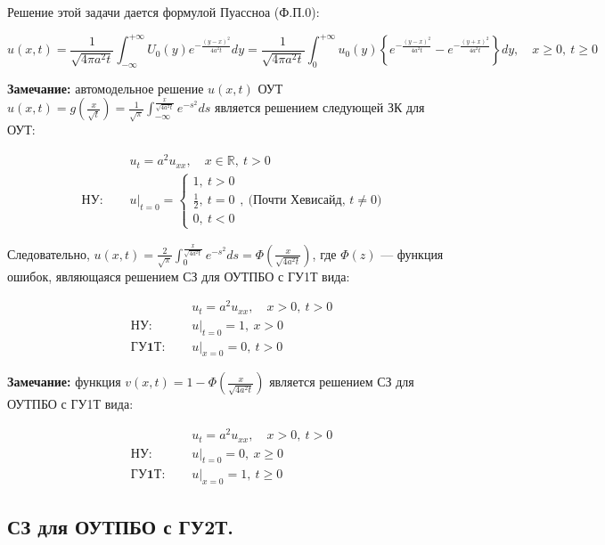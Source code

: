 Решение этой задачи дается формулой Пуассноа (Ф.П.0):

\[
	u(x, t) = \frac{1}{\sqrt{4\pi a^2t}} \int_{-\infty}^{+\infty} U_0(y) e^{-\frac{(y-x)^2}{4a^{2}t}} dy = 
	\frac{1}{\sqrt{4\pi a^2t}} \int_{0}^{+\infty} u_0(y) \left\{ e^{-\frac{(y-x)^2}{4a^{2}t}} - e^{-\frac{(y+x)^2}{4a^{2}t}} \right\} dy,\quad
	x \ge 0,\ t \ge 0
\]

\textbf{Замечание:} автомодельное решение $u(x, t)$ ОУТ $u(x, t) = g \left( \frac{x}{\sqrt{t}} \right) = \frac{1}{\sqrt{\pi}} \int_{-\infty}^{\frac{x}{\sqrt{4a^{2}t}}} e^{-s^2} ds$ является решением следующей ЗК для ОУТ:

\begin{align*}
	& u_{t} = a^2 u_{xx}, \quad x \in \mathbb{R},\ t > 0 \tag{1.0}    \\
	\textbf{НУ: } \quad    & u|_{t=0}=
	\begin{cases}
		1,\ t > 0\\
		\frac{1}{2},\ t=0\\
		0,\ t < 0
	\end{cases},\ \text{(Почти Хевисайд, $t \neq 0$)} \tag{2.НУ}
\end{align*}

Следовательно, $u(x, t) = \frac{2}{\sqrt{\pi}} \int_{0}^{\frac{x}{\sqrt{4a^{2}t}}} e^{-s^2} ds = \Phi \left( \frac{x}{\sqrt{4a^{2}t}} \right)$, где $\Phi (z)$ --- функция ошибок, являющаяся решением СЗ для ОУТПБО с ГУ1Т вида:

\begin{align*}
	& u_{t} = a^2 u_{xx}, \quad x > 0,\ t > 0 \tag{1.0}    \\
	\textbf{НУ: } \quad    & u|_{t=0}=1,\ x > 0 \tag{2} \\
	\textbf{ГУ1Т: } \quad & u|_{x=0}=0,\ t > 0 \tag{3.1.0}
\end{align*}

\textbf{Замечание:} функция $v(x, t) = 1 - \Phi \left( \frac{x}{\sqrt{4a^{2}t}} \right)$ является решением СЗ для ОУТПБО с ГУ1Т вида:

\begin{align*}
	& u_{t} = a^2 u_{xx}, \quad x > 0,\ t > 0 \tag{1.0}    \\
	\textbf{НУ: } \quad    & u|_{t=0}=0,\ x \ge 0 \tag{2.0} \\
	\textbf{ГУ1Т: } \quad & u|_{x=0}=1,\ t \ge 0 \tag{3.1}
\end{align*}

\subsection{СЗ для ОУТПБО с ГУ2Т.}

